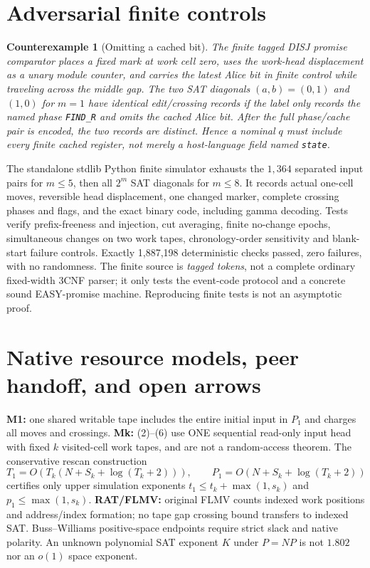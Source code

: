 \documentclass[11pt]{article}
\newtheorem{counterexample}[theorem]{Counterexample}
\begin{document}
\section{Adversarial finite controls}
\begin{counterexample}[Omitting a cached bit]
The finite tagged DISJ promise comparator places a fixed mark
at work cell zero, uses the work-head displacement as a unary
module counter, and carries the latest Alice bit in finite
control while traveling across the middle gap. The two
SAT diagonals $(a,b)=(0,1)$ and $(1,0)$ for $m=1$ have
identical edit/crossing records if the label only records the
named phase \texttt{FIND\_R} and omits the cached Alice bit.
After the full phase/cache pair is encoded, the two records
are distinct. Hence a nominal $q$ must include \emph{every}
finite cached register, not merely a host-language field
named \texttt{state}.
\end{counterexample}
The standalone stdlib Python finite simulator exhausts the
$1,364$ separated input pairs for $m\le5$, then all
$2^m$ SAT diagonals for $m\le8$. It records actual
one-cell moves, reversible head displacement, one
changed marker, complete crossing phases and flags,
and the exact binary code, including gamma decoding.
Tests verify prefix-freeness and injection, cut averaging,
finite no-change epochs, simultaneous changes on two
work tapes, chronology-order sensitivity and blank-start
failure controls. Exactly 1,887,198 deterministic checks
passed, zero failures, with no randomness.
The finite source is \emph{tagged tokens}, not a complete
ordinary fixed-width 3CNF parser; it only tests the
event-code protocol and a concrete sound EASY-promise
machine. Reproducing finite tests is not an asymptotic proof.

\section{Native resource models, peer handoff, and open arrows}
\noindent\textbf{M1:} one shared writable tape includes the entire
initial input in $P_1$ and charges all moves and crossings.
\textbf{Mk:} (2)--(6) use ONE sequential read-only input head
with fixed $k$ visited-cell work tapes, and are not a
random-access theorem. The conservative rescan
construction
\[
T_1=O(T_k(N+S_k+\log(T_k+2))),\qquad
P_1=O(N+S_k+\log(T_k+2))
\]
certifies only upper simulation exponents
$t_1\le t_k+\max(1,s_k)$ and $p_1\le\max(1,s_k)$.
\textbf{RAT/FLMV:} original FLMV counts indexed work
positions and address/index formation; no tape gap
crossing bound transfers to indexed SAT. Buss--Williams
positive-space endpoints require strict slack and native
polarity. An unknown polynomial SAT exponent $K$
under $P=NP$ is not $1.802$ nor an $o(1)$ space exponent.
\end{document}
